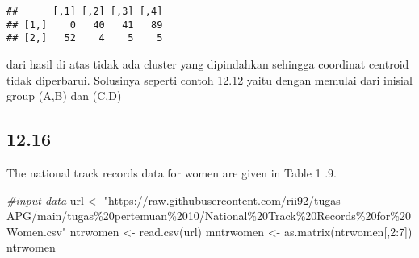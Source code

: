 \documentclass[
]{article}
\newenvironment{Shaded}{\begin{snugshade}}{\end{snugshade}}
\newcommand{\CommentTok}[1]{\textcolor[rgb]{0.56,0.35,0.01}{\textit{#1}}}
\newcommand{\DecValTok}[1]{\textcolor[rgb]{0.00,0.00,0.81}{#1}}
\newcommand{\FunctionTok}[1]{\textcolor[rgb]{0.00,0.00,0.00}{#1}}
\newcommand{\NormalTok}[1]{#1}
\newcommand{\OtherTok}[1]{\textcolor[rgb]{0.56,0.35,0.01}{#1}}
\newcommand{\SpecialCharTok}[1]{\textcolor[rgb]{0.00,0.00,0.00}{#1}}
\newcommand{\StringTok}[1]{\textcolor[rgb]{0.31,0.60,0.02}{#1}}
\begin{document}
\begin{verbatim}
##      [,1] [,2] [,3] [,4]
## [1,]    0   40   41   89
## [2,]   52    4    5    5
\end{verbatim}

dari hasil di atas tidak ada cluster yang dipindahkan sehingga coordinat
centroid tidak diperbarui. Solusinya seperti contoh 12.12 yaitu dengan
memulai dari inisial group (A,B) dan (C,D)

\hypertarget{section-2}{%
\subsection{12.16}\label{section-2}}

The national track records data for women are given in Table 1 .9.

\begin{Shaded}
\begin{Highlighting}[]
\CommentTok{\#input data}
\NormalTok{url }\OtherTok{\textless{}{-}} \StringTok{"https://raw.githubusercontent.com/rii92/tugas{-}APG/main/tugas\%20pertemuan\%2010/National\%20Track\%20Records\%20for\%20Women.csv"}
\NormalTok{ntrwomen }\OtherTok{\textless{}{-}} \FunctionTok{read.csv}\NormalTok{(url)}
\NormalTok{mntrwomen }\OtherTok{\textless{}{-}} \FunctionTok{as.matrix}\NormalTok{(ntrwomen[,}\DecValTok{2}\SpecialCharTok{:}\DecValTok{7}\NormalTok{])}
\NormalTok{ntrwomen}
\end{Highlighting}
\end{Shaded}
\end{document}
